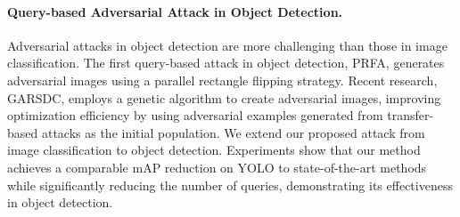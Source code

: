\paragraph{Query-based Adversarial Attack in Object Detection.} 
Adversarial attacks in object detection are more challenging than those in image classification. The first query-based attack in object detection, PRFA\cite{PRFA}, generates adversarial images using a parallel rectangle flipping strategy. Recent research, GARSDC\cite{GARSDC}, employs a genetic algorithm to create adversarial images, improving optimization efficiency by using adversarial examples generated from transfer-based attacks as the initial population. We extend our proposed attack from image classification to object detection. Experiments show that our method achieves a comparable mAP reduction on YOLO\cite{YOLOv8} to state-of-the-art methods while significantly reducing the number of queries, demonstrating its effectiveness in object detection.